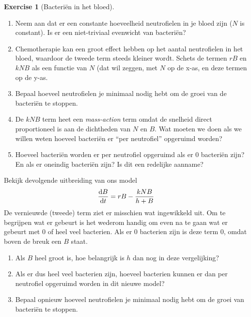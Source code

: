 \documentclass[
  letterpaper,
  DIV=11,
  numbers=noendperiod]{scrartcl}
\theoremstyle{definition}
\newtheorem{exercise}{Exercise}[section]
\theoremstyle{remark}
\begin{document}
\begin{exercise}[Bacteriën in het
bloed]
\begin{enumerate}
\def\labelenumi{\alph{enumi}.}
\setcounter{enumi}{2}
\item
  Neem aan dat er een constante hoeveelheid neutrofielen in je bloed
  zijn (\(N\) is constant). Is er een niet-triviaal evenwicht van
  bacteriën?
\item
  Chemotherapie kan een groot effect hebben op het aantal neutrofielen
  in het bloed, waardoor de tweede term steeds kleiner wordt. Schets de
  termen \(rB\) en \(kNB\) als een functie van \(N\) (dat wil zeggen,
  met \(N\) op de x-as, en deze termen op de y-as.
\item
  Bepaal hoeveel neutrofielen je minimaal nodig hebt om de groei van de
  bacteriën te stoppen.
\item
  De \(kNB\) term heet een \emph{mass-action} term omdat de snelheid
  direct proportioneel is aan de dichtheden van \(N\) en \(B\). Wat
  moeten we doen als we willen weten hoeveel bacteriën er ``per
  neutrofiel'' opgeruimd worden?
\item
  Hoeveel bacteriën worden er per neutrofiel opgeruimd als er 0
  bacteriën zijn? En als er oneindig bacteriën zijn? Is dit een
  redelijke aanname?
\end{enumerate}

Bekijk devolgende uitbreiding van ons model
\[\mathchoice{\frac{\mathrm{d}B}
{\mathrm{d}t}}{\mathrm{d}B/\mathrm{d}t}
{\mathrm{d}B/\mathrm{d}t}
{\mathrm{d}B/\mathrm{d}t}=rB-\frac{kNB}{h+B}  \] De vernieuwde (tweede)
term ziet er misschien wat ingewikkeld uit. Om te begrijpen wat er
gebeurt is het wederom handig om even na te gaan wat er gebeurt met 0 of
heel veel bacterien. Als er 0 bacterien zijn is deze term 0, omdat boven
de breuk een \(B\) staat.

\begin{enumerate}
\def\labelenumi{\alph{enumi}.}
\setcounter{enumi}{7}
\item
  Als \(B\) heel groot is, hoe belangrijk is \(h\) dan nog in deze
  vergelijking?
\item
  Als er dus heel veel bacterien zijn, hoeveel bacterien kunnen er dan
  per neutrofiel opgeruimd worden in dit nieuwe model?
\item
  Bepaal opnieuw hoeveel neutrofielen je minimaal nodig hebt om de groei
  van bacteriën te stoppen.
\end{enumerate}

\end{exercise}
\end{document}
